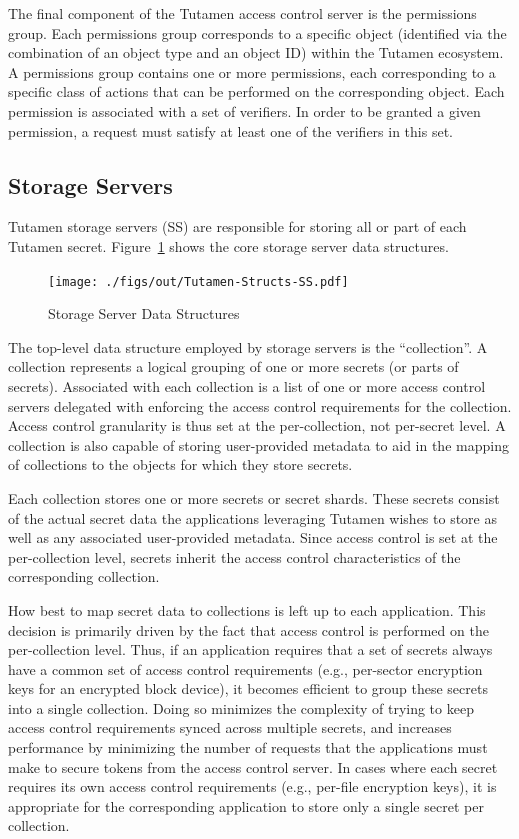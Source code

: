 The final component of the Tutamen access control server is the
permissions group. Each permissions group corresponds to a specific
object (identified via the combination of an object type and an object
ID) within the Tutamen ecosystem. A permissions group contains one or
more permissions, each corresponding to a specific class of actions
that can be performed on the corresponding object. Each permission is
associated with a set of verifiers. In order to be granted a given
permission, a request must satisfy at least one of the verifiers in
this set.

\subsection{Storage Servers}
\label{chap:tutamen:arch:ss}

Tutamen storage servers (SS) are responsible for storing all or part
of each Tutamen secret. Figure~\ref{fig:tutamen:storagestructs} shows
the core storage server data structures.

\begin{figure}[t]
  \centering
  \texttt{[image: ./figs/out/Tutamen-Structs-SS.pdf]}
  \caption{Storage Server Data Structures}
  \label{fig:tutamen:storagestructs}
\end{figure}

The top-level data structure employed by storage servers is the
``collection''. A collection represents a logical grouping of one or
more secrets (or parts of secrets). Associated with each collection is
a list of one or more access control servers delegated with enforcing
the access control requirements for the collection. Access control
granularity is thus set at the per-collection, not per-secret level. A
collection is also capable of storing user-provided metadata to aid in
the mapping of collections to the objects for which they store
secrets.

Each collection stores one or more secrets or secret shards. These
secrets consist of the actual secret data the applications leveraging
Tutamen wishes to store as well as any associated user-provided
metadata. Since access control is set at the per-collection level,
secrets inherit the access control characteristics of the
corresponding collection.

How best to map secret data to collections is left up to each
application. This decision is primarily driven by the fact that access
control is performed on the per-collection level. Thus, if an
application requires that a set of secrets always have a common set of
access control requirements (e.g., per-sector encryption keys for an
encrypted block device), it becomes efficient to group these secrets
into a single collection. Doing so minimizes the complexity of trying
to keep access control requirements synced across multiple secrets,
and increases performance by minimizing the number of requests that
the applications must make to secure tokens from the access control
server. In cases where each secret requires its own access control
requirements (e.g., per-file encryption keys), it is appropriate for
the corresponding application to store only a single secret per
collection.

